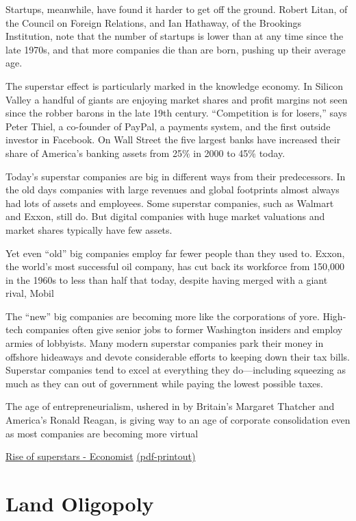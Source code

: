 \documentclass[
]{book}
\begin{document}
Startups, meanwhile, have found it harder to get off the ground. Robert Litan, of the Council on Foreign Relations, and Ian Hathaway, of the Brookings Institution, note that the number of startups is lower than at any time since the late 1970s, and that more companies die than are born, pushing up their average age.

The superstar effect is particularly marked in the knowledge economy. In Silicon Valley a handful of giants are enjoying market shares and profit margins not seen since the robber barons in the late 19th century. ``Competition is for losers,'' says Peter Thiel, a co-founder of PayPal, a payments system, and the first outside investor in Facebook. On Wall Street the five largest banks have increased their share of America's banking assets from 25\% in 2000 to 45\% today.

Today's superstar companies are big in different ways from their predecessors. In the old days companies with large revenues and global footprints almost always had lots of assets and employees. Some superstar companies, such as Walmart and Exxon, still do. But digital companies with huge market valuations and market shares typically have few assets.

Yet even ``old'' big companies employ far fewer people than they used to. Exxon, the world's most successful oil company, has cut back its workforce from 150,000 in the 1960s to less than half that today, despite having merged with a giant rival, Mobil

The ``new'' big companies are becoming more like the corporations of yore. High-tech companies often give senior jobs to former Washington insiders and employ armies of lobbyists. Many modern superstar companies park their money in offshore hideaways and devote considerable efforts to keeping down their tax bills. Superstar companies tend to excel at everything they do---including squeezing as much as they can out of government while paying the lowest possible taxes.

The age of entrepreneurialism, ushered in by Britain's Margaret Thatcher and America's Ronald Reagan, is giving way to an age of corporate consolidation even as most companies are becoming more virtual

\href{https://www.economist.com/special-report/2016/09/15/the-rise-of-the-superstars}{Rise of superstars - Economist}
\href{/pdf/Economist_2016_Superstars.pdf}{(pdf-printout)}

\hypertarget{land-oligopoly}{%
\section{Land Oligopoly}\label{land-oligopoly}}
\end{document}
